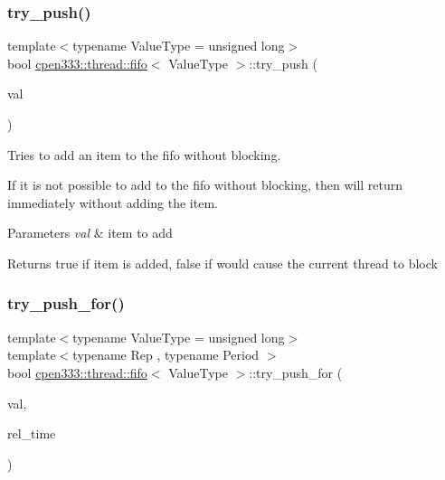 \subsubsection{\texorpdfstring{try\+\_\+push()}{try\_push()}}
{\footnotesize\ttfamily template$<$typename Value\+Type  = unsigned long$>$ \\
bool \hyperlink{classcpen333_1_1thread_1_1fifo}{cpen333\+::thread\+::fifo}$<$ Value\+Type $>$\+::try\+\_\+push (\begin{DoxyParamCaption}\item[{const Value\+Type \&}]{val }\end{DoxyParamCaption})\hspace{0.3cm}{\ttfamily [inline]}}



Tries to add an item to the fifo without blocking. 

If it is not possible to add to the fifo without blocking, then will return immediately without adding the item.


\begin{DoxyParams}{Parameters}
{\em val} & item to add \\
\hline
\end{DoxyParams}
\begin{DoxyReturn}{Returns}
{\ttfamily true} if item is added, {\ttfamily false} if would cause the current thread to block 
\end{DoxyReturn}
\mbox{\label{classcpen333_1_1thread_1_1fifo_a2142a9e6fbedd8b5fc350f1f3fe0542b}} 
\subsubsection{\texorpdfstring{try\+\_\+push\+\_\+for()}{try\_push\_for()}}
{\footnotesize\ttfamily template$<$typename Value\+Type  = unsigned long$>$ \\
template$<$typename Rep , typename Period $>$ \\
bool \hyperlink{classcpen333_1_1thread_1_1fifo}{cpen333\+::thread\+::fifo}$<$ Value\+Type $>$\+::try\+\_\+push\+\_\+for (\begin{DoxyParamCaption}\item[{const Value\+Type \&}]{val,  }\item[{std\+::chrono\+::duration$<$ Rep, Period $>$ \&}]{rel\+\_\+time }\end{DoxyParamCaption})\hspace{0.3cm}{\ttfamily [inline]}}



